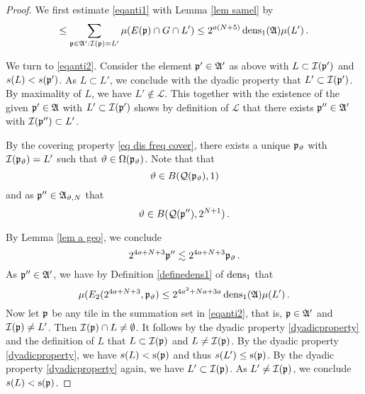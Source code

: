 \begin{proof}
We first estimate \eqref{eqanti1}
with Lemma \ref{lem samel} by
\begin{equation}\label{equanti1.5}
    \le \sum_{\mathfrak p\in\mathfrak{A}':\mathcal{I}(\mathfrak p)=L'}\mu(E(\mathfrak p)\cap G\cap L')\le 2^{a(N+5)}\operatorname{\operatorname{dens}}_1(\mathfrak{A})\mu(L')\, .
\end{equation}



We turn to \eqref{eqanti2}.
Consider the element $\mathfrak p'\in \mathfrak{A}'$ as above
with $L\subset \mathcal{I}(\mathfrak p')$ and $s(L)<s(\mathfrak p')$.
As $L\subset L'$, we conclude with the dyadic property that $L'\subset \mathcal{I}(\mathfrak p')$.
By maximality of $L$, we have
$L'\not\in \mathcal{L}$.
This together with the existence of the given $\mathfrak p'\in \mathfrak{A}$
with $L'\subset \mathcal{I}(\mathfrak p')$
shows by definition of $\mathcal{L}$ that there exists $\mathfrak p''\in \mathfrak{A}'$ with
$\mathcal{I}(\mathfrak p'')\subset L'$.




By the covering property \eqref{eq dis freq cover}, there exists a unique $\mathfrak p_\vartheta$ with $\mathcal{I}(\mathfrak p_\vartheta)=L'$
such that $\vartheta\in \Omega(\mathfrak p_\vartheta)$.
Note that
that
\begin{equation}
    \vartheta\in B(\mathcal{Q}(\mathfrak p_\vartheta), 1)
\end{equation}
and as  $\mathfrak p'' \in \mathfrak{A}_{\vartheta,N}$ that
\begin{equation}
    \vartheta \in B(\mathcal{Q}(\mathfrak p''), 2^{N+1})\, .
\end{equation}


By Lemma \ref{lem a geo}, we conclude
\begin{equation}
     2^{4a+N+3}\mathfrak p''  \lesssim  2^{4a+N+3}\mathfrak p_\vartheta \, .
 \end{equation}
As $\mathfrak p''\in \mathfrak{A}'$, we have by Definition
\eqref{definedens1} of $\operatorname{\operatorname{dens}}_1$ that
\begin{equation}\label{pmfadens}
   {\mu(E_2(2^{4a+N+3}, \mathfrak p_\vartheta)}\le 2^{4a^2+Na+3a}\operatorname{\operatorname{dens}}_1(\mathfrak{A}) {\mu(L')}\, .
\end{equation}
Now let $\mathfrak p$ be any tile in the summation set in \eqref{eqanti2}, that is, $\mathfrak p\in \mathfrak{A}'$ and $\mathcal{I}(\mathfrak p)\neq L'$.
Then $\mathcal{I}(\mathfrak p)\cap L\neq \emptyset$. It follows by the dyadic property \eqref{dyadicproperty}
and the definition of $L$ that
$L\subset \mathcal{I}(\mathfrak p)$ and $L\neq \mathcal{I}(\mathfrak p)$. By the dyadic property \eqref{dyadicproperty}, we have
$s(L)<\mathrm{s}(\mathfrak p)$ and thus $s(L')\le \mathrm{s}(\mathfrak p)$. By the dyadic property
   \eqref{dyadicproperty} again, we have $L'\subset \mathcal{I}(\mathfrak p)$.
As $L'\neq \mathcal{I}(\mathfrak p)$, we conclude $s(L)<\mathrm{s}(\mathfrak p)$.





\end{proof}
